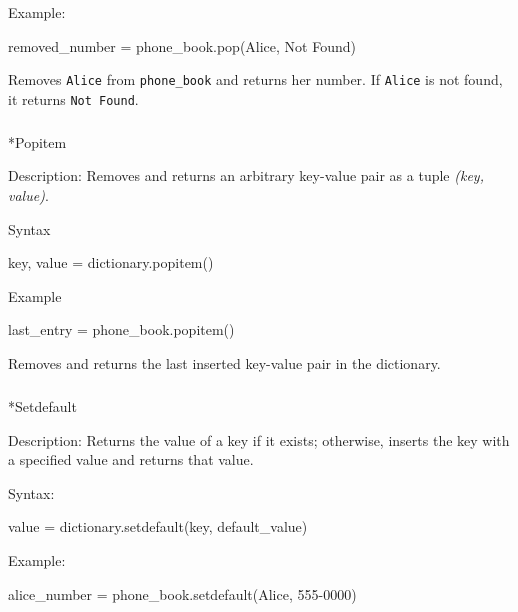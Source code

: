 \documentclass[
  letterpaper,
  DIV=11,
  numbers=noendperiod]{scrreprt}
\makeatletter
\let\oldsubparagraph\subparagraph
\renewcommand{\subparagraph}{
    \@ifstar
      \xxxSubParagraphStar
      \xxxSubParagraphNoStar
  }
\newcommand{\xxxSubParagraphStar}[1]{\oldsubparagraph*{#1}\mbox{}}
\newcommand{\xxxSubParagraphNoStar}[1]{\oldsubparagraph{#1}\mbox{}}
\newenvironment{Shaded}{\begin{snugshade}}{\end{snugshade}}
\newcommand{\NormalTok}[1]{\textcolor[rgb]{0.00,0.23,0.31}{#1}}
\makeatother
\begin{document}
Example:

\begin{Shaded}
\begin{Highlighting}[]
\NormalTok{removed\_number = phone\_book.pop(\textquotesingle{}Alice\textquotesingle{}, \textquotesingle{}Not Found\textquotesingle{})}
\end{Highlighting}
\end{Shaded}

Removes \texttt{\textquotesingle{}Alice\textquotesingle{}} from
\texttt{phone\_book} and returns her number. If
\texttt{\textquotesingle{}Alice\textquotesingle{}} is not found, it
returns \texttt{\textquotesingle{}Not\ Found\textquotesingle{}}.

\subparagraph*{Popitem}\label{popitem}

Description: Removes and returns an arbitrary key-value pair as a tuple
\emph{(key, value)}.

Syntax

\begin{Shaded}
\begin{Highlighting}[]
\NormalTok{key, value = dictionary.popitem()}
\end{Highlighting}
\end{Shaded}

Example

\begin{Shaded}
\begin{Highlighting}[]
\NormalTok{last\_entry = phone\_book.popitem()}
\end{Highlighting}
\end{Shaded}

Removes and returns the last inserted key-value pair in the dictionary.

\subparagraph*{Setdefault}\label{setdefault}

Description: Returns the value of a key if it exists; otherwise, inserts
the key with a specified value and returns that value.

Syntax:

\begin{Shaded}
\begin{Highlighting}[]
\NormalTok{value = dictionary.setdefault(key, default\_value)}
\end{Highlighting}
\end{Shaded}

Example:

\begin{Shaded}
\begin{Highlighting}[]
\NormalTok{alice\_number = phone\_book.setdefault(\textquotesingle{}Alice\textquotesingle{}, \textquotesingle{}555{-}0000\textquotesingle{})}
\end{Highlighting}
\end{Shaded}
\end{document}
